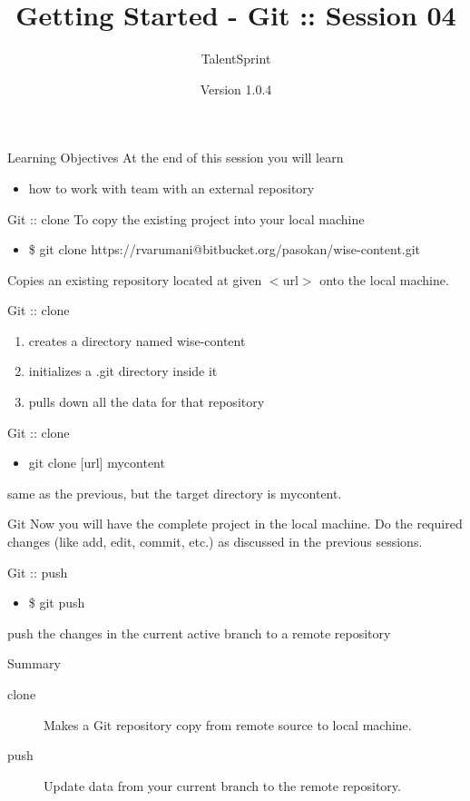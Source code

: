 \documentclass[14pt]{beamer}
\title[BPT:VCS:04]{Getting Started - Git :: Session 04}
\author[TS]{TalentSprint}
\institute[L\&D]{Licensed To Skill}
\date{Version 1.0.4}
\begin{document}
\begin{frame}
  \titlepage
\end{frame}
	
\begin{frame}{Learning Objectives}
At the end of this session you will learn
  \begin{itemize}
  \item how to work with team with an external repository
  \end{itemize}
\end{frame}

\begin{frame}{Git :: clone}
To copy the existing project into your local machine 
\begin{itemize}
\item \$ git clone https://rvarumani@bitbucket.org/pasokan/wise-content.git
\end{itemize}
\begin{block}{}
Copies an existing repository located at given $<$url$>$ onto the local machine.
\end{block}
\end{frame}

\begin{frame}{Git :: clone}
\begin{enumerate}
\item creates a directory named wise-content
\item initializes a .git directory inside it
\item pulls down all the data for that repository
\end{enumerate}
\end{frame}

\begin{frame}{Git :: clone}
\begin{itemize}
\item git clone [url] mycontent
\end{itemize}
\begin{block}{}
same as the previous, but the target directory is mycontent.
\end{block}
\end{frame}

\begin{frame}{Git}
Now you will have the complete project in the local machine. Do the required changes (like add, edit, commit, etc.) as discussed in the previous sessions.
\end{frame}

\begin{frame}{Git :: push}
\begin{itemize}
\item \$ git push
\end{itemize}
\begin{block}{}
push the changes in the current active branch to a remote repository
\end{block}
\end{frame}

\begin{frame}{Summary}
\begin{description}
\item [clone] Makes a Git repository copy from remote source to local machine.
\item [push] Update data from your current branch to the remote repository.
\end{description}
\end{frame}
\end{document}
